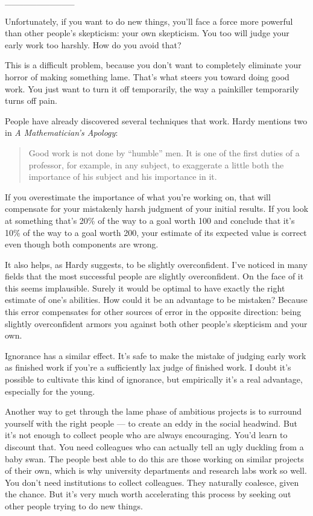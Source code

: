 \_\_\_\_\_\_\_\_\_\_\_

Unfortunately, if you want to do new things, you'll face a force more
powerful than other people's skepticism: your own skepticism. You too
will judge your early work too harshly. How do you avoid that?

This is a difficult problem, because you don't want to completely
eliminate your horror of making something lame. That's what steers you
toward doing good work. You just want to turn it off temporarily, the
way a painkiller temporarily turns off pain.

People have already discovered several techniques that work. Hardy
mentions two in \emph{A Mathematician's Apology}:

\begin{quote}
Good work is not done by ``humble'' men. It is one of the first duties
of a professor, for example, in any subject, to exaggerate a little both
the importance of his subject and his importance in it.
\end{quote}

If you overestimate the importance of what you're working on, that will
compensate for your mistakenly harsh judgment of your initial results.
If you look at something that's 20\% of the way to a goal worth 100 and
conclude that it's 10\% of the way to a goal worth 200, your estimate of
its expected value is correct even though both components are wrong.

It also helps, as Hardy suggests, to be slightly overconfident. I've
noticed in many fields that the most successful people are slightly
overconfident. On the face of it this seems implausible. Surely it would
be optimal to have exactly the right estimate of one's abilities. How
could it be an advantage to be mistaken? Because this error compensates
for other sources of error in the opposite direction: being slightly
overconfident armors you against both other people's skepticism and your
own.

Ignorance has a similar effect. It's safe to make the mistake of judging
early work as finished work if you're a sufficiently lax judge of
finished work. I doubt it's possible to cultivate this kind of
ignorance, but empirically it's a real advantage, especially for the
young.

Another way to get through the lame phase of ambitious projects is to
surround yourself with the right people --- to create an eddy in the
social headwind. But it's not enough to collect people who are always
encouraging. You'd learn to discount that. You need colleagues who can
actually tell an ugly duckling from a baby swan. The people best able to
do this are those working on similar projects of their own, which is why
university departments and research labs work so well. You don't need
institutions to collect colleagues. They naturally coalesce, given the
chance. But it's very much worth accelerating this process by seeking
out other people trying to do new things.

